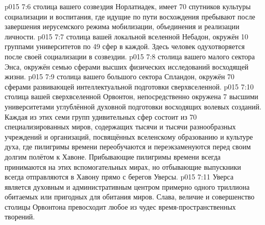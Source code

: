 \vs p015 7:6 \pc {} столица вашего созвездия Норлатиадек, имеет 70 спутников культуры социализации и воспитания, где идущие по пути восхождения пребывают после завершения иерусемского режима мобилизации, объединения и реализации личности.
\vs p015 7:7 \pc {} столица вашей локальной вселенной Небадон, окружён 10 группами университетов по 49 сфер в каждой. Здесь человек одухотворяется после своей социализации в созвездии.
\vs p015 7:8 \pc {} столица вашего малого сектора Энса, окружён семью сферами высших физических исследований восходящей жизни.
\vs p015 7:9 \pc {} столица вашего большого сектора Спландон, окружён 70 сферами развивающей интеллектуальной подготовки сверхвселенной.
\vs p015 7:10 \pc {} столица вашей сверхвселенной Орвонтон, непосредственно окружена 7 высшими университетами углублённой духовной подготовки восходящих волевых созданий. Каждая из этих семи групп удивительных сфер состоит из 70 специализированных миров, содержащих тысячи и тысячи разнообразных учреждений и организаций, посвящённых вселенскому образованию и культуре духа, где пилигримы времени переобучаются и переэкзаменуются перед своим долгим полётом к Хавоне. Прибывающие пилигримы времени всегда принимаются на этих вспомогательных мирах, но отбывающие выпускники всегда отправляются в Хавону прямо с берегов Уверсы.
\vs p015 7:11 Уверса является духовным и административным центром примерно одного триллиона обитаемых или пригодных для обитания миров. Слава, величие и совершенство столицы Орвонтона превосходит любое из чудес время\hyp{}пространственных творений.
